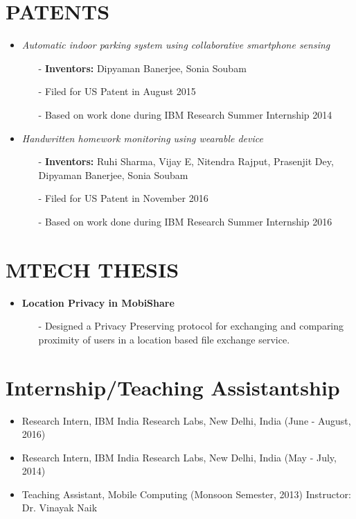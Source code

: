 \documentclass{res}
\begin{document}
\begin{resume}
\section{PATENTS}
\begin{itemize}
\item \textit{Automatic indoor parking system using collaborative smartphone sensing}
\begin{itemize}
\item[-] \textbf{Inventors:}  Dipyaman Banerjee, Sonia Soubam
\item[-] Filed for US Patent in August 2015
\item[-] Based on work done during IBM Research Summer Internship 2014
\end{itemize}

\item \textit{Handwritten homework monitoring using wearable device}
\begin{itemize}
\item[-] \textbf{Inventors:}  Ruhi Sharma, Vijay E, Nitendra Rajput, Prasenjit Dey, Dipyaman Banerjee, Sonia Soubam
\item[-] Filed for US Patent in November 2016
\item[-] Based on work done during IBM Research Summer Internship 2016
\end{itemize}
\end{itemize}

 \section{MTECH THESIS}
                    
                     \begin{itemize}  \itemsep -2pt %
                     \item \textbf{Location Privacy in MobiShare}
                     \begin{itemize}
                     \item[-] Designed a Privacy Preserving protocol for exchanging and comparing proximity of users in a location based file exchange service.
                     \end{itemize}
                    \end{itemize}



   
    
 \section{Internship/Teaching Assistantship}
 \begin{itemize}
 \item Research Intern, IBM India Research Labs, New Delhi, India (June - August, 2016)
\item Research Intern, IBM India Research Labs, New Delhi, India (May - July, 2014)
 \item Teaching Assistant, Mobile Computing (Monsoon Semester, 2013) Instructor: Dr. Vinayak Naik
 \end{itemize}
   


\end{resume}
\end{document}
